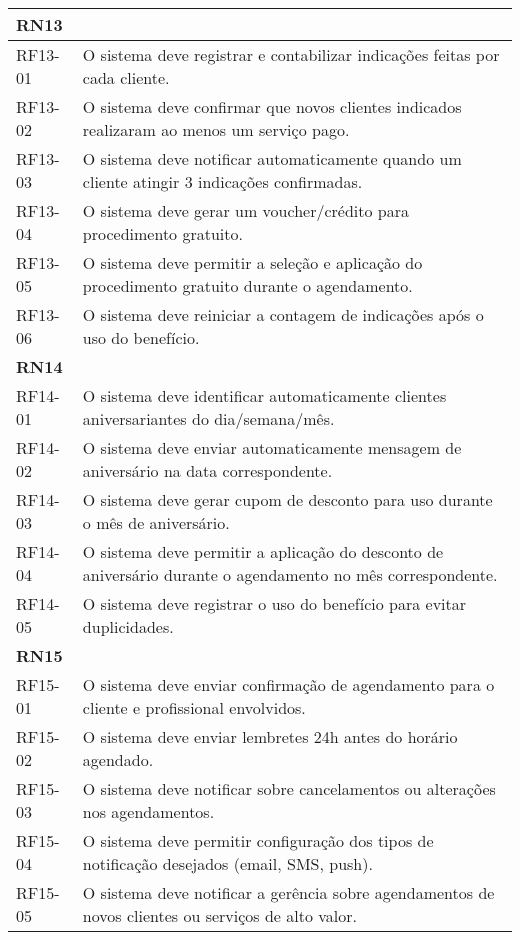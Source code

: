 \begin{longtable}{|p{}|p{}|}
	\multicolumn{2}{|l|}{\textbf{RN13}} \\ \hline
	RF13-01 & O sistema deve registrar e contabilizar indicações feitas por cada cliente. \\ \hline
	RF13-02 & O sistema deve confirmar que novos clientes indicados realizaram ao menos um serviço pago. \\ \hline
	RF13-03 & O sistema deve notificar automaticamente quando um cliente atingir 3 indicações confirmadas. \\ \hline
	RF13-04 & O sistema deve gerar um voucher/crédito para procedimento gratuito. \\ \hline
	RF13-05 & O sistema deve permitir a seleção e aplicação do procedimento gratuito durante o agendamento. \\ \hline
	RF13-06 & O sistema deve reiniciar a contagem de indicações após o uso do benefício. \\ \hline
		
	\multicolumn{2}{|l|}{\textbf{RN14}} \\ \hline
	RF14-01 & O sistema deve identificar automaticamente clientes aniversariantes do dia/semana/mês. \\ \hline
	RF14-02 & O sistema deve enviar automaticamente mensagem de aniversário na data correspondente. \\ \hline
	RF14-03 & O sistema deve gerar cupom de desconto para uso durante o mês de aniversário. \\ \hline
	RF14-04 & O sistema deve permitir a aplicação do desconto de aniversário durante o agendamento no mês correspondente. \\ \hline
	RF14-05 & O sistema deve registrar o uso do benefício para evitar duplicidades. \\ \hline
	
	\multicolumn{2}{|l|}{\textbf{RN15}} \\ \hline
	RF15-01 & O sistema deve enviar confirmação de agendamento para o cliente e profissional envolvidos. \\ \hline
	RF15-02 & O sistema deve enviar lembretes 24h antes do horário agendado. \\ \hline
	RF15-03 & O sistema deve notificar sobre cancelamentos ou alterações nos agendamentos. \\ \hline
	RF15-04 & O sistema deve permitir configuração dos tipos de notificação desejados (email, SMS, push). \\ \hline
	RF15-05 & O sistema deve notificar a gerência sobre agendamentos de novos clientes ou serviços de alto valor. \\ \hline
	

\end{longtable}
